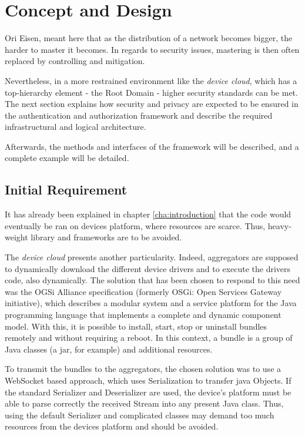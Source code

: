 \chapter{Concept and Design}
\label{cha:03:design_concept}


Ori Eisen, meant here that as the distribution of a network becomes bigger, the harder to master it becomes. In regards to security issues, mastering is then often replaced by controlling and mitigation. 

Nevertheless, in a more restrained environment like the \emph{device cloud}, which has a top-hierarchy element - the Root Domain - higher security standards can be met. The next section explains how security and privacy are expected to be ensured in the authentication and authorization framework and describe the required infrastructural and logical architecture.

Afterwards, the methods and interfaces of the framework will be described, and a complete example will be detailed.

\section{Initial Requirement}
It has already been explained in chapter \ref{cha:introduction} that the code would eventually be ran on devices platform, where resources are scarce. Thus, heavy-weight library and frameworks are to be avoided.

The \emph{device cloud} presents another particularity. Indeed, aggregators are supposed to dynamically download the different device drivers and to execute the drivers code, also dynamically. The solution that has been chosen to respond to this need was the OGSi Alliance specification (formerly OSGi: Open Services Gateway initiative), which describes a modular system and a service platform for the Java programming language that implements a complete and dynamic component model. With this, it is possible to install, start, stop or uninstall bundles remotely and without requiring a reboot. In this context, a bundle is a group of Java classes (a jar, for example) and additional resources.

To transmit the bundles to the aggregators, the chosen solution was to use a WebSocket based approach, which uses Serialization to transfer java Objects. If the standard Serializer and Deserializer are used, the device's platform must be able to parse correctly the received Stream into any present Java class. Thus, using the default Serializer and complicated classes may demand too much resources from the devices platform and should be avoided.

